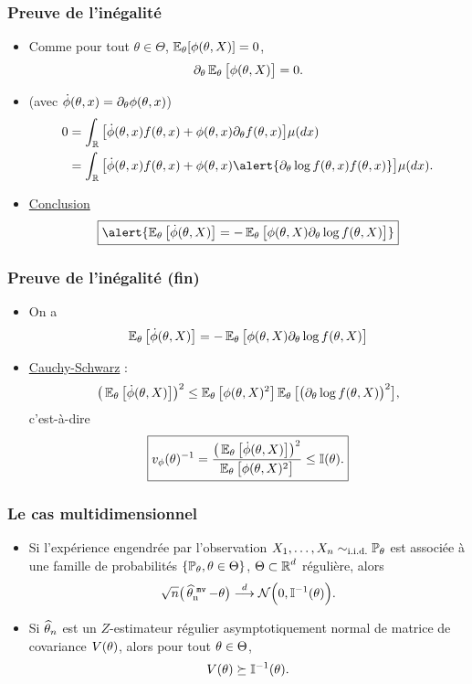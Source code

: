 \begin{frame}
\frametitle{Preuve de l'inégalité}
\begin{itemize}
\item Comme pour tout $\theta \in \Theta$, $\operatorname{{\mathbb E}}_\theta[\phi(\theta,X)]=0$,
$$
\partial_\theta \operatorname{{\mathbb E}}_\theta\big[\phi(\theta,X)\big]=0.
$$
\item (avec $\dot\phi(\theta, x)=\partial_{\theta}\phi(\theta,x)$)
\begin{align*}
0&=\int_{\R}\big[\dot \phi(\truetheta,x)f(\truetheta,x)+\phi(\truetheta,x)\partial_\truetheta f(\truetheta,x)\big]\mu(dx)\\
& = \int_{\R}\big[\dot \phi(\truetheta,x)f(\truetheta,x)+\phi(\truetheta, x)\alert{\partial_\truetheta \log f(\truetheta, x) f(\truetheta,x)}\big]\mu(dx).
\end{align*}
\item \underline{Conclusion}
$$\boxed{\alert{\E_\truetheta\big[\dot \phi(\truetheta,X)\big] = -\E_\truetheta\big[\phi(\truetheta, X)\partial_\truetheta \log f(\truetheta,X)\big]}}$$
\end{itemize}
\end{frame}

\begin{frame}
\frametitle{Preuve de l'inégalité (fin)}
\begin{itemize}
\item On a
$$\operatorname{{\mathbb E}}_\theta\big[\dot \phi(\theta,X)\big] = -\operatorname{{\mathbb E}}_\theta\big[\phi(\theta, X)\partial_\theta \log f(\theta,X)\big]$$
\item \underline{Cauchy-Schwarz} :
$$\big(\operatorname{{\mathbb E}}_\theta\big[\dot \phi(\theta,X)\big] \big)^2 \leq \operatorname{{\mathbb E}}_\theta\big[\phi(\theta, X)^2\big] \operatorname{{\mathbb E}}_\theta\big[\big(\partial_\theta \log f(\theta,X)\big)^2\big],$$
c'est-à-dire
$$\boxed{v_\phi(\theta)^{-1} = \frac{\big(\operatorname{{\mathbb E}}_\theta\big[\dot \phi(\theta,X)\big] \big)^2}{\operatorname{{\mathbb E}}_\theta\big[\phi(\theta, X)^2\big]} \leq \mathbb{I}(\theta).}$$
\end{itemize}
\end{frame}

\begin{frame}
\frametitle{Le cas multidimensionnel}
\begin{prop}
\begin{itemize}
\item Si l'expérience engendrée par l'observation $X_1,\ldots, X_n\sim_{\text{i.i.d.}}\operatorname{{\mathbb P}}_\theta$ est associée à une famille de probabilités $\{\operatorname{{\mathbb P}}_\theta, \theta \in \Theta\}$,  $\Theta \subset \operatorname{{\mathbb R}}^d$ \alert{ régulière}, alors
$$\sqrt{n}\big(\operatorname{\widehat \theta_n^{\,\,{\tt mv}}}-\theta\big) \stackrel{d}{\longrightarrow} {\mathcal N}\Big(0,\mathbb{I}^{-1}(\theta)\Big).$$
\item Si $\operatorname{\widehat \theta_{\mathnormal{n}}}$ est un $Z$-estimateur \alert{régulier} asymptotiquement normal de \alert{matrice de covariance} $V(\theta)$, alors pour tout $\theta \in \Theta$,
$$V(\theta) \succeq \mathbb{I}^{-1}(\theta).$$
\end{itemize}
\end{prop}
\end{frame}




